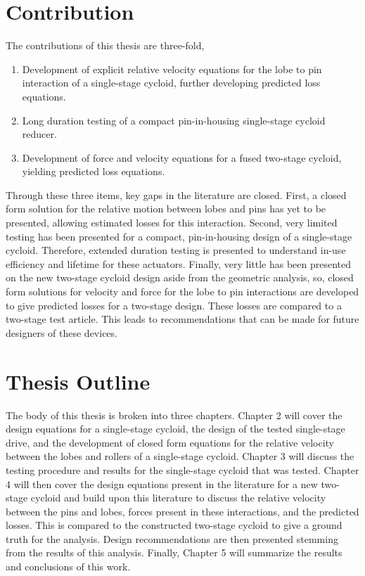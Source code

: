 \section{Contribution} \label{intro:contribution}


The contributions of this thesis are three-fold,
\begin{enumerate}
	\item Development of explicit relative velocity equations for the lobe to pin interaction of a single-stage cycloid, further developing predicted loss equations.
	\item Long duration testing of a compact pin-in-housing single-stage cycloid reducer.
	\item Development of force and velocity equations for a fused two-stage cycloid, yielding predicted loss equations. 
\end{enumerate}
Through these three items, key gaps in the literature are closed. First, a closed form solution for the relative motion between lobes and pins has yet to be presented, allowing estimated losses for this interaction. Second, very limited testing has been presented for a compact, pin-in-housing design of a single-stage cycloid. Therefore, extended duration testing is presented to understand in-use efficiency and lifetime for these actuators. Finally, very little has been presented on the new two-stage cycloid design aside from the geometric analysis, so, closed form solutions for velocity and force for the lobe to pin interactions are developed to give predicted losses for a two-stage design. These losses are compared to a two-stage test article. This leads to recommendations that can be made for future designers of these devices. 

\section{Thesis Outline} \label{intro:outline}
The body of this thesis is broken into three chapters. Chapter 2 will cover the design equations for a single-stage cycloid, the design of the tested single-stage drive, and the development of closed form equations for the relative velocity between the lobes and rollers of a single-stage cycloid. Chapter 3 will discuss the testing procedure and results for the single-stage cycloid that was tested. Chapter 4 will then cover the design equations present in the literature for a new two-stage cycloid and build upon this literature to discuss the relative velocity between the pins and lobes, forces present in these interactions, and the predicted losses. This is compared to the constructed two-stage cycloid to give a ground truth for the analysis. Design recommendations are then presented stemming from the results of this analysis. Finally, Chapter 5 will summarize the results and conclusions of this work. 

